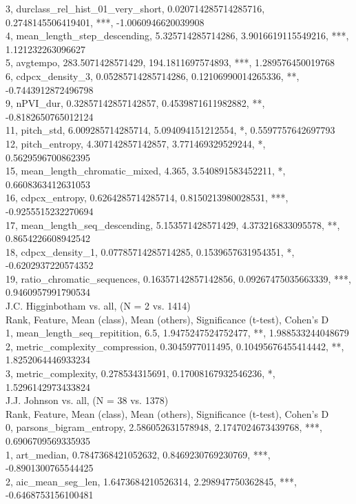 3, durclass_rel_hist_01_very_short, 0.020714285714285716, 0.2748145506419401, ***, -1.0060946620039908\\
4, mean_length_step_descending, 5.325714285714286, 3.9016619115549216, ***, 1.121232263096627\\
5, avgtempo, 283.5071428571429, 194.1811697574893, ***, 1.289576450019768\\
6, cdpcx_density_3, 0.05285714285714286, 0.12106990014265336, **, -0.7443912872496798\\
9, nPVI_dur, 0.32857142857142857, 0.4539871611982882, **, -0.8182650765012124\\
11, pitch_std, 6.009285714285714, 5.094094151212554, *, 0.5597757642697793\\
12, pitch_entropy, 4.307142857142857, 3.771469329529244, *, 0.5629596700862395\\
15, mean_length_chromatic_mixed, 4.365, 3.540891583452211, *, 0.6608363412631053\\
16, cdpcx_entropy, 0.6264285714285714, 0.8150213980028531, ***, -0.9255515232270694\\
17, mean_length_seq_descending, 5.153571428571429, 4.373216833095578, **, 0.8654226608942542\\
18, cdpcx_density_1, 0.07785714285714285, 0.1539657631954351, *, -0.6202937220574352\\
19, ratio_chromatic_sequences, 0.16357142857142856, 0.09267475035663339, ***, 0.9460957991790534\\
J.C. Higginbotham vs. all, (N = 2 vs. 1414)\\
Rank, Feature, Mean (class), Mean (others), Significance (t-test), Cohen's D\\
1, mean_length_seq_repitition, 6.5, 1.9475247524752477, **, 1.988533244048679\\
2, metric_complexity_compression, 0.3045977011495, 0.10495676455414442, **, 1.8252064446933234\\
3, metric_complexity, 0.278534315691, 0.17008167932546236, *, 1.5296142973433824\\
J.J. Johnson vs. all, (N = 38 vs. 1378)\\
Rank, Feature, Mean (class), Mean (others), Significance (t-test), Cohen's D\\
0, parsons_bigram_entropy, 2.586052631578948, 2.1747024673439768, ***, 0.6906709569335935\\
1, art_median, 0.7847368421052632, 0.8469230769230769, ***, -0.8901300765544425\\
2, aic_mean_seg_len, 1.6473684210526314, 2.298947750362845, ***, -0.6468753156100481\\

